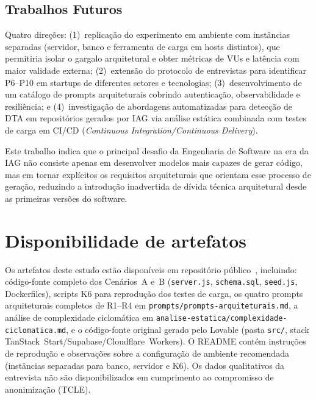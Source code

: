\documentclass[sigconf]{acmart}
\begin{document}
\subsection{Trabalhos Futuros}

Quatro direções: (1)~replicação do experimento em ambiente com instâncias
separadas (servidor, banco e ferramenta de carga em hosts distintos), que permitiria
isolar o gargalo arquitetural e obter métricas de VUs e latência com maior validade
externa; (2)~extensão do protocolo de entrevistas para identificar P6--P10 em
startups de diferentes setores e tecnologias; (3)~desenvolvimento de um catálogo de
prompts arquiteturais cobrindo autenticação, observabilidade e resiliência; e
(4)~investigação de abordagens automatizadas para detecção de DTA em repositórios
gerados por IAG via análise estática combinada com testes de carga em CI/CD (\textit{Continuous Integration/Continuous Delivery}).

Este trabalho indica que o principal desafio da Engenharia de Software na era da
IAG não consiste apenas em desenvolver modelos mais
capazes de gerar código, mas em tornar explícitos os requisitos arquiteturais que
orientam esse processo de geração, reduzindo a introdução inadvertida de dívida
técnica arquitetural desde as primeiras versões do software.

\section*{Disponibilidade de artefatos}

Os artefatos deste estudo estão disponíveis em repositório
público~\cite{GenAIDebt2026},
incluindo: código-fonte completo dos Cenários~A e~B (\texttt{server.js},
\texttt{schema.sql}, \texttt{seed.js}, Dockerfiles), scripts K6 para reprodução
dos testes de carga, os quatro prompts arquiteturais completos de R1--R4 em
\texttt{prompts/\linebreak[0]prompts-arquiteturais.md}, a análise de complexidade
ciclomática em \texttt{analise-estatica/\linebreak[0]complexidade-ciclomatica.md},
e o código-fonte original gerado pelo Lovable (pasta \texttt{src/}, stack
TanStack~Start/Supabase/Cloudflare~Workers). O README contém instruções de
reprodução e observações sobre a configuração de ambiente recomendada (instâncias
separadas para banco, servidor e K6). Os dados qualitativos da entrevista não são
disponibilizados em cumprimento ao compromisso de anonimização (TCLE).
\end{document}
